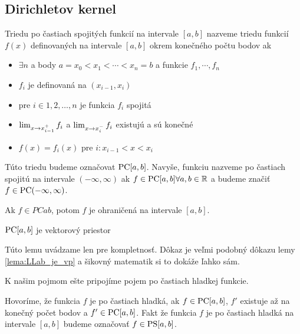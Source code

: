 
\subsection{Dirichletov kernel}
\begin{definicia}
    Triedu po častiach spojitých funkcií na intervale $[a,b]$ nazveme
    triedu funkcií $f(x)$ definovaných na intervale $[a,b]$ okrem
    konečného počtu bodov ak
    \begin{itemize}
        \item
            $\exists n$ a body $a=x_0<x_1<\cdots<x_n=b$ a funkcie
            $f_1, \cdots, f_n$
        \item
            $f_i$ je definovaná na $(x_{i-1},x_i)$
        \item
            pre $i \in 1,2,\dots,n$ je funkcia $f_i$ spojitá
        \item
            $\lim_{x \rightarrow x_{i-1}^+} f_i$ a 
            $\lim_{x \rightarrow x_i^-} f_i$ existujú a sú konečné
        \item
            $f(x) = f_i(x)$ pre $i: x_{i-1} < x < x_i$
    \end{itemize}
    Túto triedu budeme označovat $\mbox{PC}[a,b]$. Navyše, funkciu nazveme po
    častiach spojitú na intervale $(-\infty,\infty)$ ak $f\in \mbox{PC}[a,b]
    \forall a,b \in {\mathbb R}$ a budeme značiť $f\in\mbox{PC}(-\infty,\infty)$.
\end{definicia}

\begin{lema}
    Ak $f \in PCab$, potom $f$ je ohraničená na intervale $[a,b]$.
    \label{lema:ohranicenost_na_pcab}
\end{lema}

\begin{lema}
    $\mbox{PC}[a,b]$ je vektorový priestor
\end{lema}
\begin{dokaz}
    Túto lemu uvádzame len pre kompletnosť. Dôkaz je veľmi podobný
    dôkazu lemy \ref{lema:LLab_je_vp} a šikovný matematik si to dokáže
    ľahko sám.
\end{dokaz}

K našim pojmom ešte pripojíme pojem po častiach hladkej funkcie.
\begin{definicia}
    Hovoríme, že funkcia $f$ je po častiach hladká, ak
    $f \in \mbox{PC}[a,b]$, $f'$ existuje až na konečný počet bodov
    a $f'\in \mbox{PC}[a,b]$. Fakt že funkcia $f$ je po častiach hladká na
    intervale $[a,b]$ budeme označovať $f\in\mbox{PS}[a,b]$.
\end{definicia}


